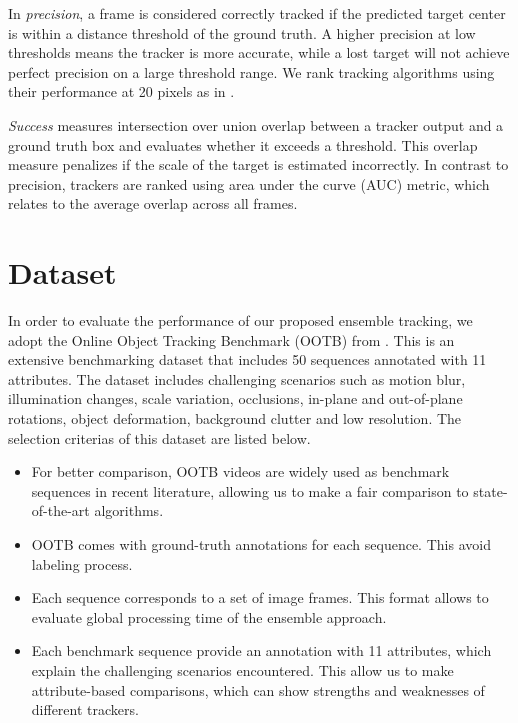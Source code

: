 In
\textit{precision}, a frame is considered correctly tracked if the predicted
target center is within a distance threshold of the ground truth.
A higher precision at low thresholds means the tracker is
more accurate, while a lost target will not achieve perfect precision on a large
threshold range.
We rank tracking algorithms using their performance at 20 pixels
as in \cite{Babenko2010, Wu2013, Henriques2014}.

\textit{Success} measures intersection over union overlap between a tracker
output and a ground truth box and evaluates whether it exceeds a threshold.
This overlap measure penalizes if the scale of the target is estimated incorrectly.
In contrast to precision, trackers are ranked using area under
the curve (AUC) metric, which relates to the average overlap across all frames. 

\section{Dataset}
In order to evaluate the performance of our proposed ensemble tracking,
we adopt the Online Object Tracking Benchmark (OOTB) from \cite{Wu2013}.
This is an extensive benchmarking dataset that includes 50 sequences
annotated with 11 attributes.
The dataset includes challenging scenarios such as motion blur,
illumination changes, scale variation, occlusions,
in-plane and out-of-plane rotations, object deformation,
background clutter and low resolution. The selection criterias of this dataset
are listed below. 
\begin{itemize}
\item For better comparison, OOTB videos are widely used as benchmark sequences
in recent literature, allowing us to make a fair comparison to state-of-the-art
algorithms.
\item OOTB comes with ground-truth annotations for each sequence. This avoid
labeling process.
\item Each sequence corresponds to a set of image frames. This format allows to
evaluate global processing time of the ensemble approach.
\item Each benchmark sequence provide an annotation with 11 attributes, which
explain the challenging scenarios encountered. This allow us to make
attribute-based comparisons, which can show strengths and weaknesses
of different trackers.

\end{itemize}

